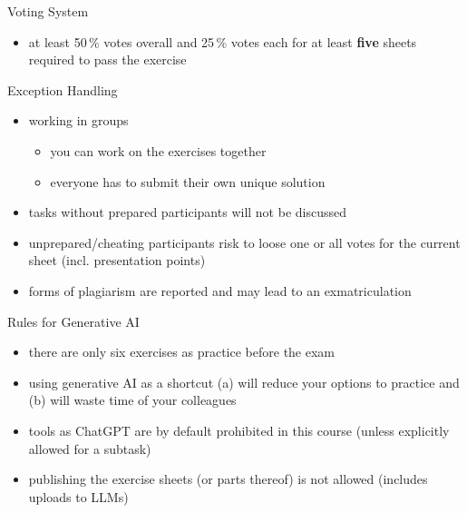 \begin{frame}{\insertsubsection}
\begin{fancycolumns}[widths={45}]
\begin{definition}{Voting System }
\begin{itemize}
				\item at least 50\,\% votes  overall and 25\,\% votes each for at least \textbf{five} sheets required to pass the exercise 
			\end{itemize}
		\end{definition}
	\end{fancycolumns}
\end{frame}

\begin{frame}{\insertsubsection}
	\begin{fancycolumns}[widths={40}]
		\begin{note}{Exception Handling}
			\begin{itemize}
				\item working in groups
				\begin{itemize}
					\item you can work on the exercises together
					\item everyone has to submit their own unique solution
				\end{itemize}
				\item tasks without prepared participants will not be discussed
				\item unprepared/cheating participants risk to loose one or all votes for the current sheet (incl. presentation points)
				\item forms of plagiarism are reported and may lead to an exmatriculation
			\end{itemize}
		\end{note}
		\nextcolumn
		\begin{note}{Rules for Generative AI}
			\begin{itemize}
				\item there are only six exercises as practice before the exam
				\item using generative AI as a shortcut (a) will reduce your options to practice and (b) will waste time of your colleagues
				\item tools as ChatGPT are by default prohibited in this course (unless explicitly allowed for a subtask)
				\item publishing the exercise sheets (or parts thereof) is not allowed (includes uploads to LLMs)
			\end{itemize}
		\end{note}
	\end{fancycolumns}
\end{frame}

